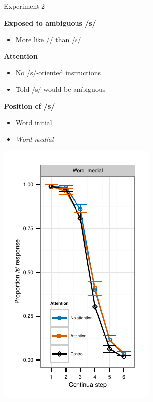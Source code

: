 \documentclass{beamer}
\begin{document}
\begin{frame}{Experiment 2}

\begin{minipage}{0.45\textwidth}
\textbf{Exposed to ambiguous /s/}
\begin{itemize}
\item More like /\textesh/ than /s/
\end{itemize}

\textbf{Attention}
\begin{itemize}
\item No /s/-oriented instructions
\item Told /s/ would be ambiguous
\end{itemize}

\textbf{Position of /s/}
\begin{itemize}
\item Word initial
\item \emph{Word medial}
\end{itemize}
\end{minipage}
\hfill
\begin{minipage}{0.45\textwidth}
\includegraphics{graphs/exp2_categresults_present2-final}
\end{minipage}

\end{frame}
\end{document}
